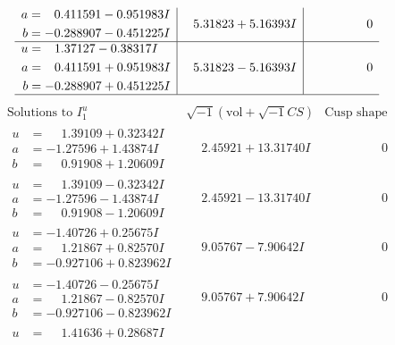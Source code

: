 \documentclass[1p]{elsarticle_modified}
\theoremstyle{definition}
\newcommand{\I}{\sqrt{-1}}
\begin{document}
$$\begin{array}{c|c|c}
\begin{aligned}
a &= \phantom{-}0.411591 - 0.951983 I \\
b &= -0.288907 - 0.451225 I\end{aligned}
 & \phantom{-}5.31823 + 5.16393 I & \phantom{-0.000000 } 0 \\ \hline\begin{aligned}
u &= \phantom{-}1.37127 - 0.38317 I \\
a &= \phantom{-}0.411591 + 0.951983 I \\
b &= -0.288907 + 0.451225 I\end{aligned}
 & \phantom{-}5.31823 - 5.16393 I & \phantom{-0.000000 } 0\\
 \hline 
 \end{array}$$\newpage$$\begin{array}{c|c|c}  
\text{Solutions to }I^u_{1}& \I (\text{vol} + \sqrt{-1}CS) & \text{Cusp shape}\\
 \hline 
\begin{aligned}
u &= \phantom{-}1.39109 + 0.32342 I \\
a &= -1.27596 + 1.43874 I \\
b &= \phantom{-}0.91908 + 1.20609 I\end{aligned}
 & \phantom{-}2.45921 + 13.31740 I & \phantom{-0.000000 } 0 \\ \hline\begin{aligned}
u &= \phantom{-}1.39109 - 0.32342 I \\
a &= -1.27596 - 1.43874 I \\
b &= \phantom{-}0.91908 - 1.20609 I\end{aligned}
 & \phantom{-}2.45921 - 13.31740 I & \phantom{-0.000000 } 0 \\ \hline\begin{aligned}
u &= -1.40726 + 0.25675 I \\
a &= \phantom{-}1.21867 + 0.82570 I \\
b &= -0.927106 + 0.823962 I\end{aligned}
 & \phantom{-}9.05767 - 7.90642 I & \phantom{-0.000000 } 0 \\ \hline\begin{aligned}
u &= -1.40726 - 0.25675 I \\
a &= \phantom{-}1.21867 - 0.82570 I \\
b &= -0.927106 - 0.823962 I\end{aligned}
 & \phantom{-}9.05767 + 7.90642 I & \phantom{-0.000000 } 0 \\ \hline\begin{aligned}
u &= \phantom{-}1.41636 + 0.28687 I \\

\end{aligned}
\end{array}$$
\end{document}

